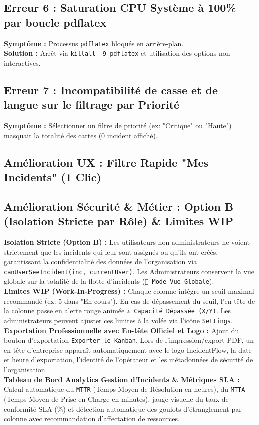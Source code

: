 \documentclass[11pt,a4paper]{article}
\begin{document}
\subsection*{Erreur 6 : Saturation CPU Système à 100\% par boucle pdflatex}
\textbf{Symptôme :} Processus \texttt{pdflatex} bloqués en arrière-plan.\\
\textbf{Solution :} Arrêt via \texttt{killall -9 pdflatex} et utilisation des options non-interactives.

\subsection*{Erreur 7 : Incompatibilité de casse et de langue sur le filtrage par Priorité}
\textbf{Symptôme :} Sélectionner un filtre de priorité (ex: "Critique" ou "Haute") masquait la totalité des cartes (0 incident affiché).\\
\subsection*{Amélioration UX : Filtre Rapide "Mes Incidents" (1 Clic)}
\subsection*{Amélioration Sécurité \& Métier : Option B (Isolation Stricte par Rôle) \& Limites WIP}
\textbf{Isolation Stricte (Option B) :} Les utilisateurs non-administrateurs ne voient strictement que les incidents qui leur sont assignés ou qu'ils ont créés, garantissant la confidentialité des données de l'organisation via \texttt{canUserSeeIncident(inc, currentUser)}. Les Administrateurs conservent la vue globale sur la totalité de la flotte d'incidents (\texttt{👑 Mode Vue Globale}).\\
\textbf{Limites WIP (Work-In-Progress) :} Chaque colonne intègre un seuil maximal recommandé (ex: 5 dans "En cours"). En cas de dépassement du seuil, l'en-tête de la colonne passe en alerte rouge animée \texttt{⚠️ Capacité Dépassée (X/Y)}. Les administrateurs peuvent ajuster ces limites à la volée via l'icône \texttt{Settings}.\\
\textbf{Exportation Professionnelle avec En-tête Officiel et Logo :} Ajout du bouton d'exportation \texttt{Exporter le Kanban}. Lors de l'impression/export PDF, un en-tête d'entreprise apparaît automatiquement avec le logo IncidentFlow, la date et heure d'exportation, l'identité de l'opérateur et les métadonnées de sécurité de l'organisation.\\
\textbf{Tableau de Bord Analytics Gestion d'Incidents \& Métriques SLA :} Calcul automatique du \texttt{MTTR} (Temps Moyen de Résolution en heures), du \texttt{MTTA} (Temps Moyen de Prise en Charge en minutes), jauge visuelle du taux de conformité SLA (\%) et détection automatique des goulots d'étranglement par colonne avec recommandation d'affectation de ressources.
\end{document}
